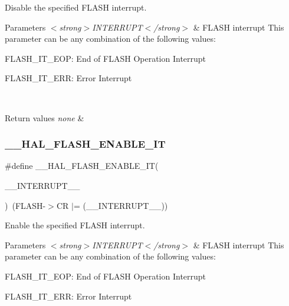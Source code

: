 Disable the specified F\+L\+A\+SH interrupt. 


\begin{DoxyParams}{Parameters}
{\em $<$strong$>$\+I\+N\+T\+E\+R\+R\+U\+P\+T$<$/strong$>$} & F\+L\+A\+SH interrupt This parameter can be any combination of the following values\+: \begin{DoxyItemize}
\item F\+L\+A\+S\+H\+\_\+\+I\+T\+\_\+\+E\+OP\+: End of F\+L\+A\+SH Operation Interrupt \item F\+L\+A\+S\+H\+\_\+\+I\+T\+\_\+\+E\+RR\+: Error Interrupt \end{DoxyItemize}
\\
\hline
\end{DoxyParams}

\begin{DoxyRetVals}{Return values}
{\em none} & \\
\hline
\end{DoxyRetVals}
\mbox{\label{group___f_l_a_s_h___exported___macros_ga13fa137a911f02a2f94fb9fb0762a340}} 
\subsubsection{\texorpdfstring{\+\_\+\+\_\+\+H\+A\+L\+\_\+\+F\+L\+A\+S\+H\+\_\+\+E\+N\+A\+B\+L\+E\+\_\+\+IT}{\_\_HAL\_FLASH\_ENABLE\_IT}}
{\footnotesize\ttfamily \#define \+\_\+\+\_\+\+H\+A\+L\+\_\+\+F\+L\+A\+S\+H\+\_\+\+E\+N\+A\+B\+L\+E\+\_\+\+IT(\begin{DoxyParamCaption}\item[{}]{\+\_\+\+\_\+\+I\+N\+T\+E\+R\+R\+U\+P\+T\+\_\+\+\_\+ }\end{DoxyParamCaption})~(F\+L\+A\+SH-\/$>$CR $\vert$= (\+\_\+\+\_\+\+I\+N\+T\+E\+R\+R\+U\+P\+T\+\_\+\+\_\+))}



Enable the specified F\+L\+A\+SH interrupt. 


\begin{DoxyParams}{Parameters}
{\em $<$strong$>$\+I\+N\+T\+E\+R\+R\+U\+P\+T$<$/strong$>$} & F\+L\+A\+SH interrupt This parameter can be any combination of the following values\+: \begin{DoxyItemize}
\item F\+L\+A\+S\+H\+\_\+\+I\+T\+\_\+\+E\+OP\+: End of F\+L\+A\+SH Operation Interrupt \item F\+L\+A\+S\+H\+\_\+\+I\+T\+\_\+\+E\+RR\+: Error Interrupt \end{DoxyItemize}
\\
\hline
\end{DoxyParams}

